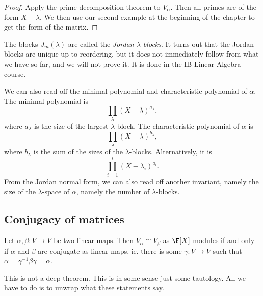 \documentclass[a4paper]{article}
\begin{document}
\begin{proof}
  Apply the prime decomposition theorem to $V_\alpha$. Then all primes are of the form $X - \lambda$. We then use our second example at the beginning of the chapter to get the form of the matrix.
\end{proof}

The blocks $J_m(\lambda)$ are called the \emph{Jordan $\lambda$-blocks}. It turns out that the Jordan blocks are unique up to reordering, but it does not immediately follow from what we have so far, and we will not prove it. It is done in the IB Linear Algebra course.

We can also read off the minimal polynomial and characteristic polynomial of $\alpha$. The minimal polynomial is
\[
  \prod_{\lambda} (X - \lambda)^{a_\lambda},
\]
where $a_\lambda$ is the size of the largest $\lambda$-block. The characteristic polynomial of $\alpha$ is
\[
  \prod_{\lambda} (X - \lambda)^{b_\lambda},
\]
where $b_\lambda$ is the sum of the sizes of the $\lambda$-blocks. Alternatively, it is
\[
  \prod_{i = 1}^t (X - \lambda_i)^{a_i}.
\]
From the Jordan normal form, we can also read off another invariant, namely the size of the $\lambda$-space of $\alpha$, namely the number of $\lambda$-blocks.

\subsection{Conjugacy of matrices}

\begin{lemma}
  Let $\alpha, \beta: V \to V$ be two linear maps. Then $V_\alpha\cong V_\beta$ as $\F[X]$-modules if and only if $\alpha$ and $\beta$ are conjugate as linear maps, ie. there is some $\gamma: V \to V$ such that $\alpha = \gamma^{-1}\beta\gamma = \alpha$.
\end{lemma}
This is not a deep theorem. This is in some sense just some tautology. All we have to do is to unwrap what these statements say.
\end{document}
